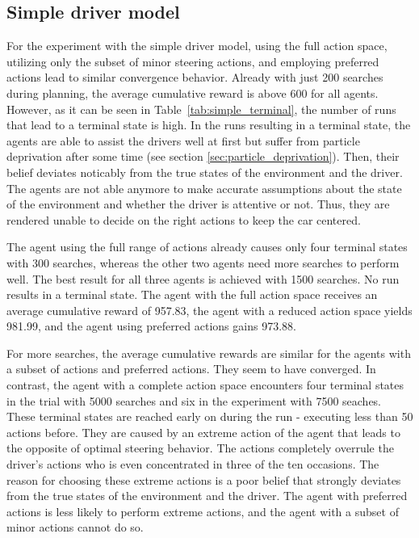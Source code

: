 \subsection{Simple driver model}

For the experiment with the simple driver model, using the full action space, utilizing only the subset of minor steering actions, and employing preferred actions lead to similar convergence behavior. Already with just 200 searches during planning, the average cumulative reward is above 600 for all agents. However, as it can be seen in Table~\ref{tab:simple_terminal}, the number of runs that lead to a terminal state is high. In the runs resulting in a terminal state, the agents are able to assist the drivers well at first but suffer from particle deprivation after some time (see section \ref{sec:particle_deprivation}). Then, their belief deviates noticably from the true states of the environment and the driver. The agents are not able anymore to make accurate assumptions about the state of the environment and whether the driver is attentive or not. Thus, they are rendered unable to decide on the right actions to keep the car centered. 



The agent using the full range of actions already causes only four terminal states with 300 searches, whereas the other two agents need more searches to perform well. The best result for all three agents is achieved with 1500 searches. No run results in a terminal state. The agent with the full action space receives an average cumulative reward of 957.83, the agent with a reduced action space yields 981.99, and the agent using preferred actions gains 973.88. 

For more searches, the average cumulative rewards are similar for the agents with a subset of actions and preferred actions. They seem to have converged. In contrast, the agent with a complete action space encounters four terminal states in the trial with 5000 searches and six in the experiment with 7500 seaches. These terminal states are reached early on during the run - executing less than 50 actions before. They are caused by an extreme action of the agent that leads to the opposite of optimal steering behavior. The actions completely overrule the driver's actions who is even concentrated in three of the ten occasions. The reason for choosing these extreme actions is a poor belief that strongly deviates from the true states of the environment and the driver. The agent with preferred actions is less likely to perform extreme actions, and the agent with a subset of minor actions cannot do so. 

